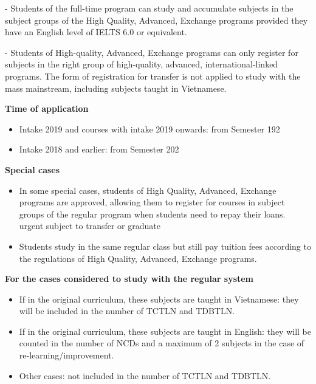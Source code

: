 - Students of the full-time program can study and accumulate subjects in the subject groups of the High Quality, Advanced, Exchange programs provided they have an English level of IELTS 6.0 or equivalent.

- Students of High-quality, Advanced, Exchange programs can only register for subjects in the right group of high-quality, advanced, international-linked programs. The form of registration for transfer is not applied to study with the mass mainstream, including subjects taught in Vietnamese.

\noindent\textbf{Time of application}

\begin{itemize}
	\item Intake 2019 and courses with intake 2019 onwards: from Semester 192
	
	\item Intake 2018 and earlier: from Semester 202
\end{itemize}

\noindent\textbf{Special cases}

\begin{itemize}
	\item In some special cases, students of High Quality, Advanced, Exchange programs are approved, allowing them to register for courses in subject groups of the regular program when students need to repay their loans. urgent subject to transfer or graduate
	
	\item Students study in the same regular class but still pay tuition fees according to the regulations of High Quality, Advanced, Exchange programs.
\end{itemize}

\noindent\textbf{For the cases considered to study with the regular system}
\begin{itemize}
	\item If in the original curriculum, these subjects are taught in Vietnamese: they will be included in the number of TCTLN and TDBTLN.
	
	\item If in the original curriculum, these subjects are taught in English: they will be counted in the number of NCDs and a maximum of 2 subjects in the case of re-learning/improvement.
	
	\item Other cases: not included in the number of TCTLN and TDBTLN.
	
\end{itemize}

